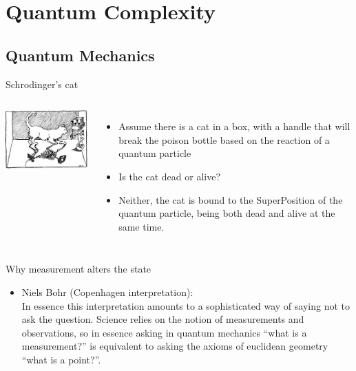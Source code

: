 
    \section{Quantum Complexity}
    \subsection{Quantum Mechanics}
    \begin{frame}{Schrodinger's cat}
        \begin{columns}[onlytextwidth]
            \includegraphics[width=\linewidth]{images/cat.jpg}
        \begin{itemize}
            \item Assume there is a cat in a box, with a handle 
            that will break the poison bottle based on the reaction of a quantum particle
            \pause
            \item Is the cat dead or alive?
            \pause
            \item Neither, the cat is bound to the \alert{SuperPosition} of the
            quantum particle, being both dead and alive at the same time.
        \end{itemize}
        
        \end{columns}
    \end{frame}
    \begin{frame}{Why measurement alters the state}
        \begin{itemize}
            \item Niels Bohr  (Copenhagen interpretation):\\
            In essence this interpretation amounts to a sophisticated way of saying not to ask the question. Science relies on the notion of measurements and observations, so in essence asking in quantum mechanics “what is a measurement?” is equivalent to asking the axioms of euclidean geometry “what is a point?”.
        \end{itemize}
    \end{frame}

